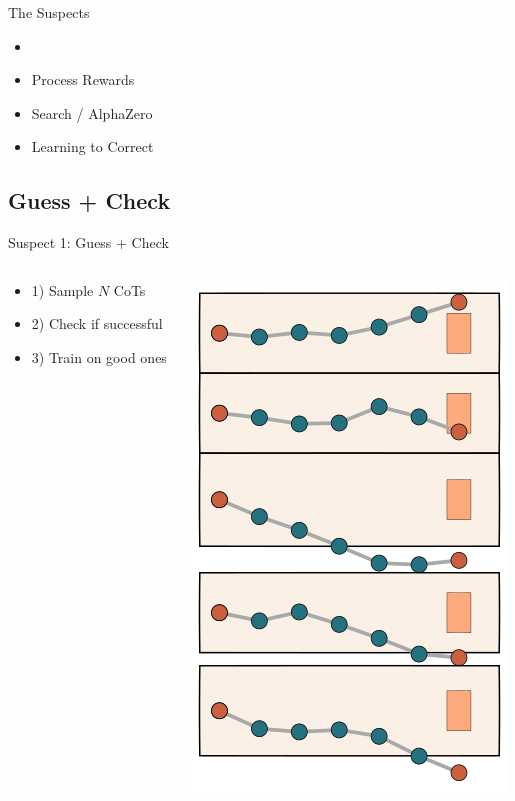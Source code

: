 \documentclass[14pt,aspectratio=169]{beamer}
\begin{document}
\begin{frame}{The Suspects}
	\begin{itemize}
		\item {}
		\item Process Rewards
		\item Search / AlphaZero
		\item Learning to Correct
	\end{itemize}
\end{frame}

\subsection{Guess + Check}

\begin{frame}{Suspect 1: Guess + Check}
	\begin{columns}
		\begin{column}{0.5\linewidth}
			\begin{itemize}
				\item 1) Sample $N$ CoTs
				\item 2) Check if successful
				\item 3) Train on good ones
			\end{itemize}
		\end{column}
		\begin{column}{0.5\linewidth}
			\begin{center}
				\includegraphics[height=0.8\textheight]{images/reject1}
			\end{center}
		\end{column}
	\end{columns}
\end{frame}
\end{document}
